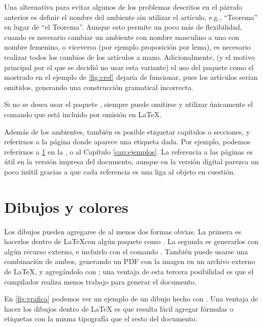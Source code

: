 Una alternativa para evitar algunos de los problemas descritos en el p\'arrafo
anterior es definir el nombre del ambiente sin utilizar el art\'iculo, e.g.,
``Teorema'' en lugar de ``el Teorema''.   Aunque esto permite un poco m\'as de
flexibilidad, cuando es necesario cambiar un ambiente con nombre masculino a uno
con nombre femenino, o viceversa (por ejemplo proposici\'on por lema), es
necesario realizar todos los cambios de los art\'iculos a mano.  Adicionalmente,
(y el motivo principal por el que se decidi\'o no usar esta variante) el uso del
paquete como el mostrado en el ejemplo de \cref{fig:cref} dejar\'ia de
funcionar, pues los art\'iculos ser\'ian omitidos, generando una construcci\'on
gramatical incorrecta.

Si no se desea usar el paquete , siempre puede omitirse y utilizar
\'unicamente el comando  que est\'a incluido por
omisi\'on en \LaTeX.

Adem\'as de los ambientes, tambi\'en es posible etiquetar cap\'itulos o
secciones, y referirnos a la p\'agina donde aparece una etiqueta dada.   Por
ejemplo, podemos referirnos a \cref{sec:dibujos} en la , o
al Cap\'itulo \ref{cap:ejemplos}.   La referencia a las p\'aginas es \'util en
la versi\'on impresa del documento, aunque en la versi\'on digital parezca un
poco in\'util gracias a que cada referencia es una liga al objeto en cuesti\'on.



\section{Dibujos y colores}
\label{sec:dibujos}

Los dibujos pueden agregarse de al menos dos formas obvias.   La primera es
hacerlos dentro de \LaTeX con alg\'un paquete como
\href{https://github.com/pgf-tikz/pgf}{}.   La segunda es
generarlos con alg\'un recurso externo, e incluirlo con el comando
.   Tambi\'en puede usarse una
combinaci\'on de ambos, generando un PDF con la imagen en un archivo externo de
\LaTeX, y agreg\'andolo con ; una ventaja
de esta tercera posibilidad es que el compilador realiza menos trabajo para
generar el documento.

En \cref{fig:grafica} podemos ver un ejemplo de un dibujo hecho con .
Una ventaja de hacer los dibujos dentro de \LaTeX{} es que resulta f\'acil
agregar f\'ormulas o etiquetas con la misma tipograf\'ia que el resto del
documento.

